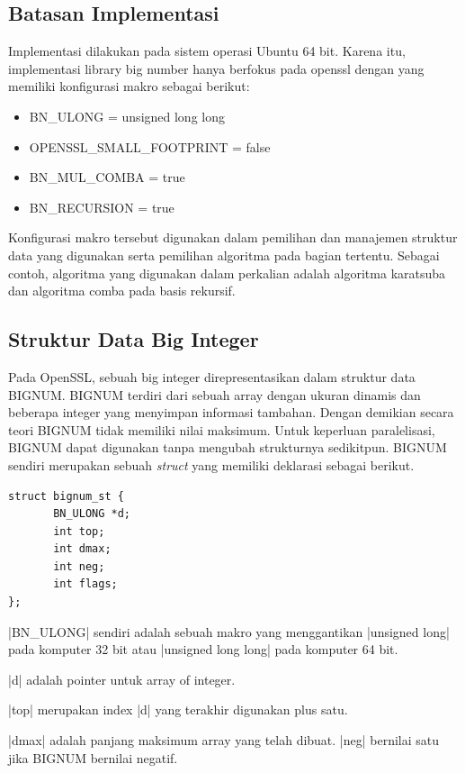 \subsection{Batasan Implementasi}
Implementasi dilakukan pada sistem operasi Ubuntu 64 bit. Karena itu, implementasi library big number hanya berfokus pada openssl dengan yang memiliki konfigurasi makro sebagai berikut:
\begin{itemize}
  \item BN\_ULONG = unsigned long long
  \item OPENSSL\_SMALL\_FOOTPRINT = false
  \item BN\_MUL\_COMBA = true
  \item BN\_RECURSION = true

\end{itemize}

Konfigurasi makro tersebut digunakan dalam pemilihan dan manajemen struktur data yang digunakan serta pemilihan algoritma pada bagian tertentu. Sebagai contoh, algoritma yang digunakan dalam perkalian adalah algoritma karatsuba dan algoritma comba pada basis rekursif.

\subsection{Struktur Data Big Integer} \label{sec:bignum_struct}
Pada OpenSSL, sebuah big integer direpresentasikan dalam struktur data BIGNUM. BIGNUM terdiri dari sebuah array dengan ukuran dinamis dan beberapa integer yang menyimpan informasi tambahan. Dengan demikian secara teori BIGNUM tidak memiliki nilai maksimum. Untuk keperluan paralelisasi, BIGNUM dapat digunakan tanpa mengubah strukturnya sedikitpun. BIGNUM sendiri merupakan sebuah \textit{struct} yang memiliki deklarasi sebagai berikut.

\begin{lstlisting}[style = code]
struct bignum_st {
       BN_ULONG *d;
       int top;
       int dmax;
       int neg;
       int flags;
};
\end{lstlisting}

|BN_ULONG| sendiri adalah sebuah makro yang menggantikan |unsigned long| pada komputer 32 bit atau |unsigned long long| pada komputer 64 bit.

|d| adalah pointer untuk array of integer.

|top| merupakan index |d| yang terakhir digunakan plus satu.

|dmax| adalah panjang maksimum array yang telah dibuat. |neg| bernilai satu jika BIGNUM bernilai negatif.

